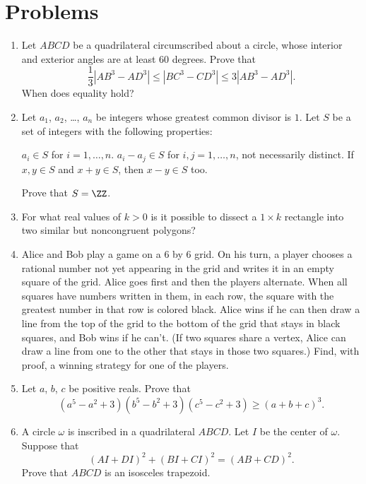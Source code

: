 \documentclass[11pt]{scrartcl}
\begin{document}
\section{Problems}
\begin{enumerate}[\bfseries 1.]
\item %
Let $ABCD$ be a quadrilateral circumscribed about a circle,
whose interior and exterior angles are at least $60$ degrees.
Prove that
\[ \frac{1}{3}|AB^3 - AD^3|
  \le |BC^3 - CD^3| \le 3|AB^3 - AD^3|.  \]
When does equality hold?

\item %
Let $a_1$, $a_2$, \dots, $a_n$ be integers whose greatest common
divisor is $1$.
Let $S$ be a set of integers with the following properties:
\begin{enumerate}
  \ii[(a)] $a_i \in S$ for $i = 1, \dots, n$.
  \ii[(b)] $a_i - a_j \in S$ for $i, j = 1, \dots, n$,
  not necessarily distinct.
  \ii[(c)] If $x, y \in S$ and $x+y \in S$,
  then $x-y \in S$ too.
\end{enumerate}
Prove that $S = \ZZ$.

\item %
For what real values of $k > 0$ is it possible to
dissect a $1 \times k$ rectangle
into two similar but noncongruent polygons?

\item %
Alice and Bob play a game on a $6$ by $6$ grid.
On his turn, a player chooses a rational number not yet appearing in the grid
and writes it in an empty square of the grid.
Alice goes first and then the players alternate.
When all squares have numbers written in them, in each row,
the square with the greatest number in that row is colored black.
Alice wins if he can then draw a line from the top of the grid to the bottom of the grid
that stays in black squares, and Bob wins if he can't.
(If two squares share a vertex,
Alice can draw a line from one to the other that stays in those two squares.)
Find, with proof, a winning strategy for one of the players.

\item %
Let $a$, $b$, $c$ be positive reals.
Prove that
\[ ( a^5-a^2+3 )( b^5-b^2+3 )( c^5-c^2+3 )
  \ge \left( a+b+c \right)^3. \]

\item %
A circle $\omega$ is inscribed in a quadrilateral $ABCD$.
Let $I$ be the center of $\omega$.
Suppose that \[ (AI + DI)^2 + (BI + CI)^2 = (AB + CD)^2.  \]
Prove that $ABCD$ is an isosceles trapezoid.

\end{enumerate}
\pagebreak
\end{document}
